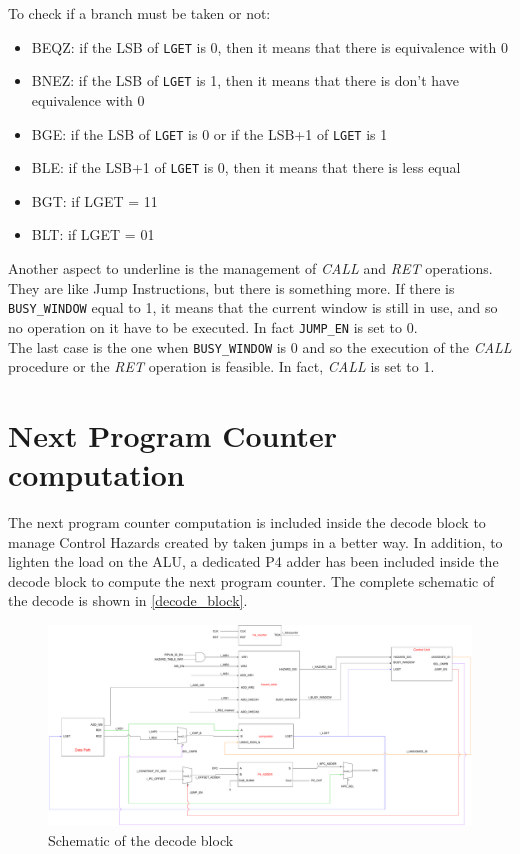 To check if a branch must be taken or not:
\begin{itemize}
  \item BEQZ: if the LSB of \texttt{LGET} is 0, then it means that there is equivalence with 0
  \item BNEZ: if the LSB of \texttt{LGET} is 1, then it means that there is don't have equivalence with 0
  \item BGE: if the LSB of \texttt{LGET} is 0 or if the LSB+1 of \texttt{LGET} is 1
  \item BLE: if the LSB+1 of \texttt{LGET} is 0, then it means that there is less equal
  \item BGT: if LGET = 11
  \item BLT: if LGET = 01
\end{itemize}

Another aspect to underline is the management of \emph{CALL} and \emph{RET} operations. They are like Jump Instructions, but there is something more. If there is \texttt{BUSY\_WINDOW} equal to 1, it means that the current window is still in use, and so no operation on it have to be executed. In fact \texttt{JUMP\_EN} is set to 0.\\

The last case is the one when \texttt{BUSY\_WINDOW} is 0 and so the execution of the \emph{CALL} procedure or the \emph{RET} operation is feasible. In fact, \emph{CALL} is set to 1.

\section{Next Program Counter computation}
The next program counter computation is included inside the decode block to manage Control Hazards created by taken jumps in a better way. In addition, to lighten the load on the ALU, a dedicated P4 adder has been included inside the decode block to compute the next program counter. 
The complete schematic of the decode is shown in \autoref{decode_block}.

\begin{figure}[H]
	\centering
  \addtolength{\leftskip}{-3cm}
  \addtolength{\rightskip}{-3cm}
	\includegraphics[width=1.2\textwidth]{chapters/4_DecodeStage/images/decode_block.pdf}
	\caption{Schematic of the decode block}
	\label{decode_block}
\end{figure}

